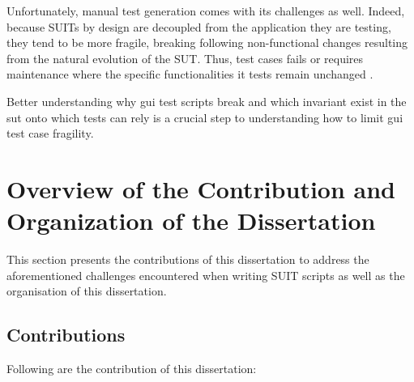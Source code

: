 Unfortunately, manual test generation comes with its challenges as well. Indeed, because SUITs by design are decoupled from the application they are testing, they tend to be more fragile, \ie breaking following non-functional changes resulting from the natural evolution of the SUT. Thus, test cases fails or requires maintenance where the specific functionalities it tests remain unchanged \cite{Coppola2019, DiMartino2021}.

Better understanding why \gls{gui} test scripts break and which invariant exist in the \gls{sut} onto which tests can rely is a crucial step to understanding how to limit \gls{gui} test case fragility.

\section{Overview of the Contribution and Organization of the Dissertation}

This section presents the contributions of this dissertation to address the aforementioned challenges encountered when writing SUIT scripts as well as the organisation of this dissertation.

\subsection{Contributions}

Following are the contribution of this dissertation:

